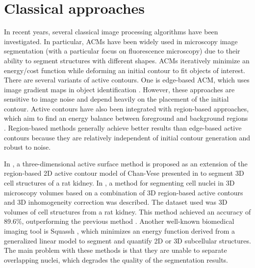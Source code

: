 \section{Classical approaches}
\label{subsection:clas}


In recent years, several classical image processing algorithms have been investigated. In particular, \ac{ACMs} have been widely used in microscopy image segmentation (with a particular focus on fluorescence microscopy) due to their ability to segment structures with different shapes. \ac{ACMs} iteratively minimize an energy/cost function while deforming an initial contour to fit objects of interest. There are several variants of active contours. One is edge-based \ac{ACM}, which uses image gradient maps in object identification \cite{snakes:active}. However, these approaches are sensitive to image noise and depend heavily on the placement of the initial contour. Active contours have also been integrated with region-based approaches, which aim to find an energy balance between foreground and background regions \cite{region:based}. Region-based methods generally achieve better results than edge-based active contours because they are relatively independent of initial contour generation and robust to noise. 


In \cite{3D:active}, a three-dimensional active surface method is proposed as an extension of the region-based \ac{2D} active contour model of Chan-Vese presented in \cite{region:based} to segment \ac{3D} cell structures of a rat kidney. In \cite{active:inhmo}, a method for segmenting cell nuclei in \ac{3D} microscopy volumes based on a combination of \ac{3D} region-based active contours and \ac{3D} inhomogeneity correction was described. The dataset used was \ac{3D} volumes of cell structures from a rat kidney. This method achieved an accuracy of 89.6\%, outperforming the previous method \cite{region:based}. Another well-known biomedical imaging tool is Squassh \cite{squass:original,squassh}, which minimizes an energy function derived from a generalized linear model to segment and quantify \ac{2D} or \ac{3D} subcellular structures. The main problem with these methods is that they are unable to separate overlapping nuclei, which degrades the quality of the segmentation results. 


